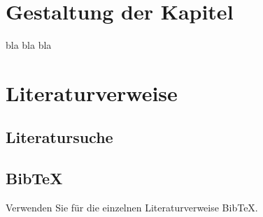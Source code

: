 \documentclass[deutsch]{llncs}
\begin{document}
\section{Gestaltung der Kapitel}
\label{sec:typo}

bla bla bla


\section{Literaturverweise}
\label{sec:bib}

\subsection{Literatursuche}
\label{subsec:search}


\subsection{BibTeX}
\label{subsec:bibtex}
Verwenden Sie für die einzelnen Literaturverweise BibTeX.


\printbibliography
\end{document}

